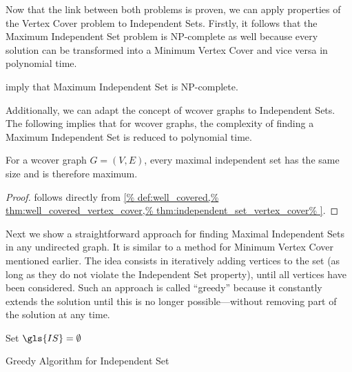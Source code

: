 Now that the link between both problems is proven, we can apply 
properties of the Vertex Cover problem to Independent Sets. Firstly,
it follows that the Maximum Independent Set problem is NP-complete as 
well because every solution can be transformed into a Minimum Vertex
Cover and vice versa in polynomial time.

\begin{theorem}
  \label{thm:maximum_independent_set_complexity}
   imply that Maximum Independent Set
  is NP-complete.
\end{theorem}

Additionally, we can adapt the concept of \gls{wcover} graphs to
Independent Sets. The following
 implies that for
\gls{wcover} graphs, the complexity of finding a Maximum Independent
Set is reduced to polynomial time.

\begin{theorem}
  \label{thm:well_covered_independent_set}
  For a \gls{wcover} graph \(G=(V,E)\), every maximal independent set
  has the same size and is therefore maximum.
  \begin{proof}
   follows directly from
  \cref{%
    def:well_covered,%
    thm:well_covered_vertex_cover,%
    thm:independent_set_vertex_cover%
  }.
  \end{proof}
\end{theorem}

Next we show a straightforward approach for finding Maximal Independent
Sets in any undirected graph. It is similar to a method for Minimum
Vertex Cover mentioned earlier. The idea consists in iteratively
adding vertices to the set (as long as they do not violate the
Independent Set property), until all vertices have been considered. Such
an approach is called ``greedy'' because it constantly extends the
solution until this is no longer possible---without removing part of
the solution at any time.

\begin{algorithm}
  \DontPrintSemicolon
  
  
  Set \(\gls{IS} = \emptyset\) \;
  \caption{\label{alg:greedy_independent_set}Greedy Algorithm for Independent Set}
\end{algorithm}

